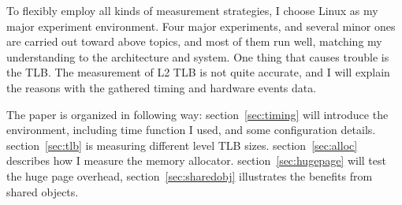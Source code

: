 To flexibly employ all kinds of measurement strategies, I choose Linux as my
major experiment environment. Four major experiments, and several minor ones
are carried out toward above topics, and most of them run well, matching my
understanding to the architecture and system. One thing that causes trouble is
the TLB. The measurement of L2 TLB is not quite accurate, and I will explain the
reasons with the gathered timing and hardware events data.

The paper is organized in following way: section~\ref{sec:timing} will
introduce the environment, including time function I used, and some
configuration details. section~\ref{sec:tlb} is measuring different level TLB sizes.
section~\ref{sec:alloc} describes how I measure the memory allocator. section~\ref{sec:hugepage} will test
the huge page overhead, section~\ref{sec:sharedobj} illustrates the benefits from shared objects.

